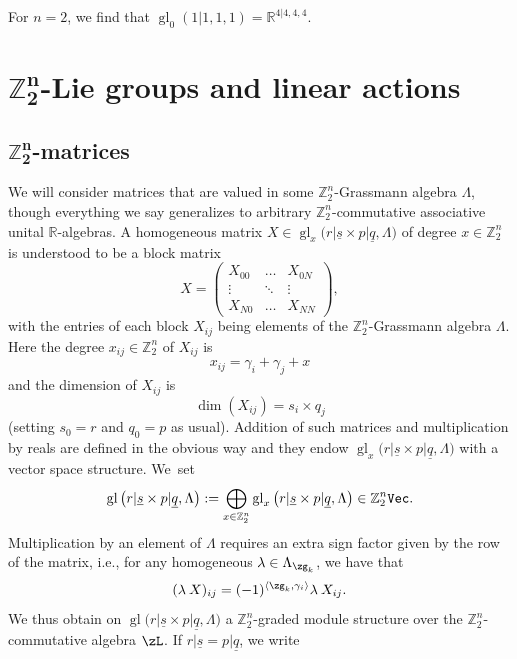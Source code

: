 \documentclass[10pt,a4paper]{amsart}
\newcommand{\op}[1]{\operatorname{#1}}
\newcommand{\R}{{\mathbb R}}
\newcommand{\Z}{{\mathbb Z}}
\def\ul{\underline}
\def\ul{\underline}
\newcommand{\0}{\otimes}
\newcommand{\z}{\Z_2^n}
\numberwithin{equation}{section}
\begin{document}
\begin{Example}
For $n=2$, we find that $\op{gl}_0(1|1,1,1) = \R^{4|4,4,4}$.
\end{Example}

\section[Z2n-Lie groups and linear actions]%
{$\boldsymbol{\Z_2^n}$-Lie groups and linear actions}

\newcommand{\gl}{\op{gl}}
\newcommand{\rim}{\mathring}

\subsection[Z2n-matrices]
{$\boldsymbol{\Z_2^n}$-matrices}\label{subsec:Zmatrices}
We will consider matrices that are valued in some $\Z_2^n$-Grassmann algebra $\Lambda$, though everything we say generalizes to arbitrary $\Z_2^n$-commutative associative unital $\R$-algebras. A homogeneous matrix $X \in \gl_x\big(r|\ul s\times p|\ul{q},\Lambda\big)$ of degree $x\in\z$ is understood to be a block matrix
\begin{equation*}%
X =\begin{pmatrix}
X_{00} & \dotsc & X_{0N} \\
\hline
\vdots & \ddots & \vdots \\
\hline
X_{N0} & \dotsc & X_{NN}
\end{pmatrix}\!,
\end{equation*}
with the entries of each block $X_{ij}$ being elements of the $\Z_2^n$-Grassmann algebra $\Lambda$. Here the degree $x_{ij}\in\z$ of $X_{ij}$ is
\[
x_{ij} = \gamma_i + \gamma_j + x
\]
and the dimension of $X_{ij}$ is
\[
\dim(X_{ij}) = s_i \times q_j
\]
(setting $s_0=r$ and $q_0 = p$ as usual). Addition of such matrices and multiplication by reals are defined in the obvious way and they endow $\gl_x\big(r|\ul s\times p|\ul{q},\Lambda\big)$ with a vector space structure. We~set
\[
\gl\big(r|\ul s\times p|\ul{q},\Lambda\big):=\bigoplus_{x\in\z}\gl_x\big(r|\ul s\times p|\ul{q},\Lambda\big)\in\z{\tt Vec}.
\]
Multiplication by an element of $\Lambda$ requires an extra sign factor given by the row of the matrix, i.e., for any homogeneous $\lambda \in \Lambda_{\zg_k}$, we have that
\[
(\lambda\: X)_{ij} = (-1)^{\langle \zg_k, \gamma_i\rangle} \lambda \: X_{ij}.
\]
We thus obtain on $\gl\big(r|\ul s\times p|\ul{q},\Lambda\big)$ a $\z$-graded module structure over the $\z$-commutative algebra $\zL$. If $ r|\ul s=p|\ul q$, we write
\end{document}
